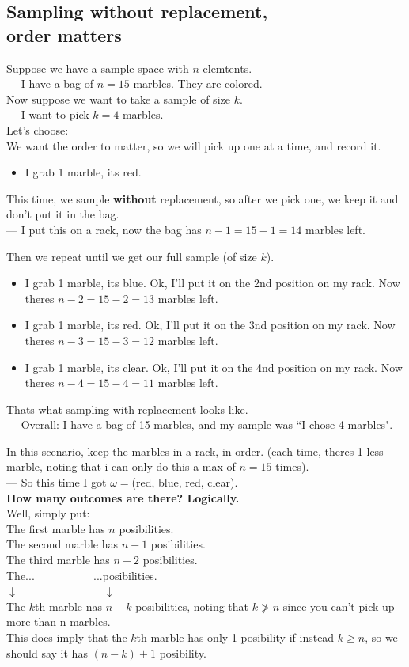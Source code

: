 \documentclass[12pt]{book}
\begin{document}
\subsection{Sampling without replacement,\\ order matters}
Suppose we have a sample space with $n$ elemtents. \\
--- I have a bag of $n=15$ marbles. They are colored.\\
Now suppose we want to take a sample of size $k$. \\
--- I want to pick $k=4$ marbles.\\

\noindent Let's choose: \\
We want the order to matter, so we will pick up one at a time, and record it.
\begin{itemize}
\item I grab 1 marble, its red.
\end{itemize}
This time, we sample \textbf{without} replacement, so after we pick one, we keep it and don't put it in the bag. \\
--- I put this on a rack, now the bag has $n-1=15-1=14$ marbles left.

\noindent Then we repeat until we get our full sample (of size $k$). 
\begin{itemize}
\item I grab 1 marble, its blue. Ok, I'll put it on the 2nd position on my rack. Now theres $n-2=15-2=13$ marbles left.
\item I grab 1 marble, its red. Ok, I'll put it on the 3nd position on my rack. Now theres $n-3=15-3=12$ marbles left.
\item I grab 1 marble, its clear. Ok, I'll put it on the 4nd position on my rack. Now theres $n-4=15-4=11$ marbles left.
\end{itemize}
Thats what sampling with replacement looks like. \\
--- Overall: I have a bag of 15 marbles, and my sample was ``I chose 4 marbles". 

In this scenario, keep the marbles in a rack, in order. (each time, theres 1 less marble, noting that i can only do this a max of $n=15$ times).\\
--- So this time I got $\omega =$(red, blue, red, clear).\\

\noindent \textbf{How many outcomes are there? Logically.} \\
Well, simply put:\\
The first marble has $n$ posibilities. \\
The second marble has $n-1$ posibilities.\\
The third marble has $n-2$ posibilities.\\
The...$~~~~~~~~~~~~~~~~~~~~~~~~$...posibilities.\\
$\downarrow ~~~~~~~~~~~~~~~~~~~~~~~~~~~~~~~~~~~\downarrow$\\
The $k$th marble nas $n-k$ posibilities, noting that $k\ngtr n$ since you can't pick up more than n marbles. \\
This does imply that the $k$th marble has only 1 posibility if instead $k\geq n$, so we should say it has $(n-k) + 1$ posibility.
\end{document}
